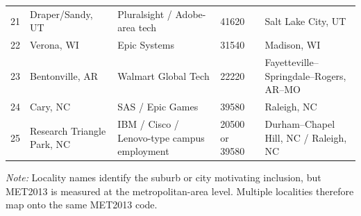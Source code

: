 \documentclass[doublespace,nopageskip]{UVAthesis}
\begin{document}
\begin{appendices}
\begin{table}[!htbp]
\begin{tabularx}{\textwidth}{@{}r C{0.15\textwidth} Y C{0.10\textwidth} Y@{}}
21 & Draper/Sandy, UT & Pluralsight / Adobe-area tech & 41620 & Salt Lake City, UT \\
22 & Verona, WI & Epic Systems & 31540 & Madison, WI \\
23 & Bentonville, AR & Walmart Global Tech & 22220 & Fayetteville--Springdale--Rogers, AR--MO \\
24 & Cary, NC & SAS / Epic Games & 39580 & Raleigh, NC \\
25 & Research Triangle Park, NC & IBM / Cisco / Lenovo-type campus employment & 20500 or 39580 & Durham--Chapel Hill, NC / Raleigh, NC \\
\bottomrule
\end{tabularx}

\vspace{0.25em}
\begin{minipage}{0.96\textwidth}
\tiny
\textit{Note:} Locality names identify the suburb or city motivating inclusion, but MET2013 is measured at the metropolitan-area level. Multiple localities therefore map onto the same MET2013 code.
\end{minipage}
\end{table}
\end{appendices}
\end{document}
